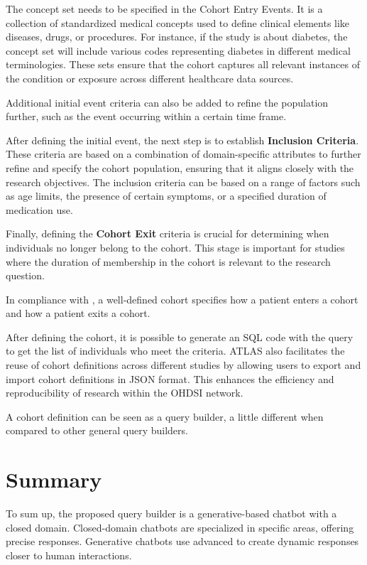 The concept set needs to be specified in the Cohort Entry Events. It is a collection of standardized medical concepts used to define clinical elements like diseases, drugs, or procedures. For instance, if the study is about diabetes, the concept set will include various codes representing diabetes in different medical terminologies. These sets ensure that the cohort captures all relevant instances of the condition or exposure across different healthcare data sources.

Additional initial event criteria can also be added to refine the population further, such as the event occurring within a certain time frame.

After defining the initial event, the next step is to establish \textbf{Inclusion Criteria}. These criteria are based on a combination of domain-specific attributes to further refine and specify the cohort population, ensuring that it aligns closely with the research objectives. The inclusion criteria can be based on a range of factors such as age limits, the presence of certain symptoms, or a specified duration of medication use.

Finally, defining the \textbf{Cohort Exit} criteria is crucial for determining when individuals no longer belong to the cohort. This stage is important for studies where the duration of membership in the cohort is relevant to the research question.

In compliance with \citet{informatics_chapter_nodate}, a well-defined cohort specifies how a patient enters a cohort and how a patient exits a cohort.

After defining the cohort, it is possible to generate an SQL code with the query to get the list of individuals who meet the criteria. ATLAS also facilitates the reuse of cohort definitions across different studies by allowing users to export and import cohort definitions in JSON format. This enhances the efficiency and reproducibility of research within the OHDSI network.

A cohort definition can be seen as a query builder, a little different when compared to other general query builders.



\section{Summary}

To sum up, the proposed query builder is a generative-based chatbot with a closed domain. Closed-domain chatbots are specialized in specific areas, offering precise responses. Generative chatbots use advanced {\lm} to create dynamic responses closer to human interactions.

